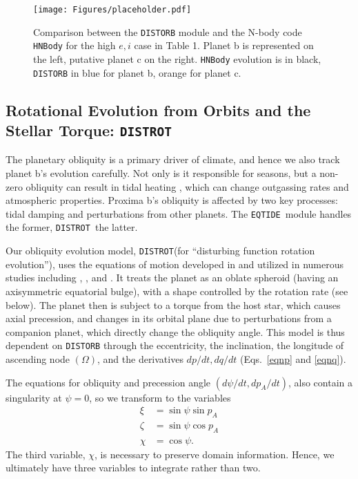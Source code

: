 \documentclass[preprint,12pt]{aastex}
\def\distorb{\texttt{\footnotesize{DISTORB}}\xspace}
\def\distrot{\texttt{\footnotesize{DISTROT}}\xspace}
\def\eqtide{\texttt{\footnotesize{EQTIDE}}\xspace}
\begin{document}
\begin{figure}
\texttt{[image: Figures/placeholder.pdf]}
\centering
\caption{Comparison between the \distorb module and the N-body code
  {\footnotesize \texttt{HNBody}} for the high $e,i$ case in Table 1.
  Planet b is represented on the left, putative planet c on the
  right. {\footnotesize \texttt{HNBody}} evolution is in black,
  \distorb in blue for planet b, orange for planet c.}
\label{fig:orbitvalid}
\end{figure} 

\subsection{Rotational Evolution from Orbits and the Stellar Torque: \distrot}
\label{sec:models:distrot}
The planetary obliquity is a primary driver of climate, and hence we
also track planet b's evolution carefully. Not only is it responsible
for seasons, but a non-zero obliquity can result in tidal heating
\citep{Heller11}, which can change outgassing rates and atmospheric
properties. Proxima b's obliquity is affected by two key processes:
tidal damping and perturbations from other planets. The \eqtide~module
handles the former, \distrot~the latter.

Our obliquity evolution model, \distrot (for ``disturbing function
rotation evolution''), uses the equations of motion developed in
\cite{Kinoshita1975, Kinoshita1977} and utilized in numerous studies
including \cite{Laskar1986}, \cite{Laskar1993a,Laskar1993b}, and
\cite{Armstrong14}.  It treats the planet as an oblate spheroid
(having an axisymmetric equatorial bulge), with a shape controlled by
the rotation rate (see below). The planet then is subject to a torque
from the host star, which causes axial precession, and changes in its
orbital plane due to perturbations from a companion planet, which
directly change the obliquity angle.  This model is thus dependent on
\distorb through the eccentricity, the inclination, the longitude of
ascending node $(\Omega)$, and the derivatives $dp/dt, dq/dt$
(Eqs.~\ref{eqnp} and \ref{eqnq}).

The equations for obliquity and precession angle $(d\psi/dt,
dp_A/dt)$, also contain a singularity at $\psi = 0$, so we transform
to the variables
\begin{align}
\xi & = \sin{\psi} \sin{p_A} \\
\zeta & = \sin{\psi} \cos{p_A} \\
\chi & = \cos{\psi}.
\end{align}
The third variable, $\chi$, is necessary to preserve domain
information. Hence, we ultimately have three variables to integrate
rather than two.
\end{document}
